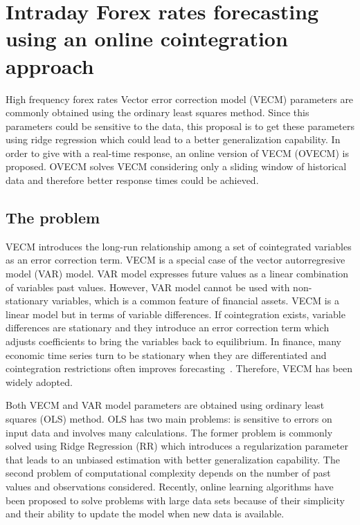 \chapter{Intraday Forex rates forecasting using an online cointegration approach}

High frequency forex rates 
Vector error correction model (VECM) parameters are commonly obtained using the
ordinary least squares method. Since this parameters could be sensitive to the
data, this proposal is to get these parameters using ridge regression which
could lead to a better generalization capability. In order to give with a
real-time response, an online version of VECM (OVECM) is proposed. OVECM solves
VECM considering only a sliding window of historical data and therefore
better response times could be achieved.


\section{The problem}

VECM introduces the long-run relationship among a set of cointegrated variables
as an error correction term. VECM is a special case of the vector autorregresive
model (VAR) model. VAR model expresses future values as a linear combination of
variables past values.  However, VAR model cannot be used with non-stationary
variables, which is a common feature of financial assets. VECM is a linear model
but in terms of variable differences. If cointegration exists, variable
differences are stationary and they introduce an error correction term which
adjusts coefficients to bring the variables back to equilibrium. In finance,
many economic time series turn to be stationary when they are differentiated and
cointegration restrictions often improves forecasting~\cite{duy1998}. Therefore,
VECM has been widely adopted.

Both VECM and VAR model parameters are obtained using ordinary least squares
(OLS) method. OLS has two main problems: is sensitive to errors on input data
and involves many calculations. The former problem is commonly solved using
Ridge Regression (RR) \cite{hoerl1970} which introduces a regularization
parameter that leads to an unbiased estimation with better generalization
capability. The second problem of computational complexity depends on the number
of past values and observations considered.  Recently, online learning
algorithms have been proposed to solve problems with large data sets because of
their simplicity and their ability to update the model when new data is
available. 

